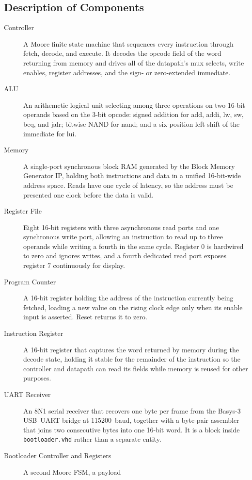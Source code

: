 \documentclass[11pt,letterpaper]{article}
\begin{document}
\subsection{Description of Components}
\begin{description}
  \item[Controller] A Moore finite state machine that sequences every
    instruction through fetch, decode, and execute. It decodes the opcode field
    of the word returning from memory and drives all of the datapath's mux
    selects, write enables, register addresses, and the sign- or zero-extended
    immediate.
  \item[ALU] An arithemetic logical unit selecting among three operations on two 16-bit operands based on the 3-bit opcode: signed addition for add, addi, lw, sw, beq, and jalr; bitwise NAND for nand; and a six-position left shift of the immediate for lui.
  \item[Memory] A single-port synchronous block RAM generated by the Block Memory Generator IP, holding both instructions and data in a unified 16-bit-wide address space. Reads have one cycle of latency, so the address must be presented one clock before the data is valid. 
  \item[Register File] Eight 16-bit registers with three asynchronous read ports and one synchronous write port, allowing an instruction to read up to three operands while writing a fourth in the same cycle. Register 0 is hardwired to zero and ignores writes, and a fourth dedicated read port exposes register 7 continuously for display.
  \item[Program Counter] A 16-bit register holding the address of the instruction currently being fetched, loading a new value on the rising clock edge only when its enable input is asserted. Reset returns it to zero.
  \item[Instruction Register] A 16-bit register that captures the word returned by memory during the decode state, holding it stable for the remainder of the instruction so the controller and datapath can read its fields while memory is reused for other purposes.
  \item[UART Receiver] An 8N1 serial receiver that recovers one byte per frame
    from the Basys-3 USB--UART bridge at 115200~baud, together with a byte-pair
    assembler that joins two consecutive bytes into one 16-bit word. It is a
    block inside \texttt{bootloader.vhd} rather than a separate entity.
  \item[Bootloader Controller and Registers] A second Moore FSM, a payload

\end{description}
\end{document}
